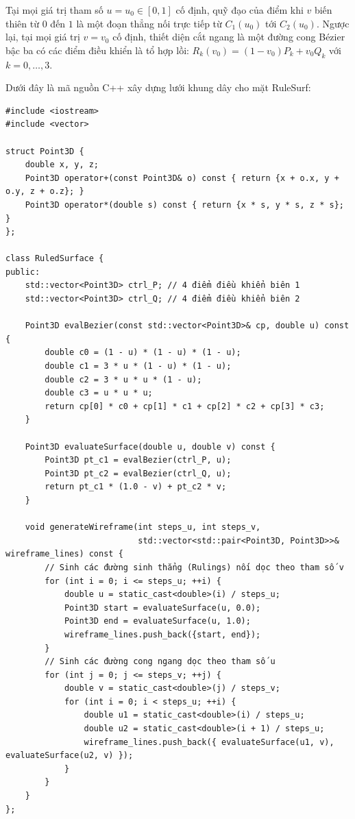 Tại mọi giá trị tham số $u = u_0 \in [0, 1]$ cố định, quỹ đạo của điểm khi $v$ biến thiên từ $0$ đến $1$ là một đoạn thẳng nối trực tiếp từ $C_1(u_0)$ tới $C_2(u_0)$. Ngược lại, tại mọi giá trị $v = v_0$ cố định, thiết diện cắt ngang là một đường cong Bézier bậc ba có các điểm điều khiển là tổ hợp lồi: $R_k(v_0) = (1 - v_0) P_k + v_0 Q_k$ với $k = 0, \dots, 3$.

Dưới đây là mã nguồn C++ xây dựng lưới khung dây cho mặt RuleSurf:

\begin{verbatim}
#include <iostream>
#include <vector>

struct Point3D {
    double x, y, z;
    Point3D operator+(const Point3D& o) const { return {x + o.x, y + o.y, z + o.z}; }
    Point3D operator*(double s) const { return {x * s, y * s, z * s}; }
};

class RuledSurface {
public:
    std::vector<Point3D> ctrl_P; // 4 điểm điều khiển biên 1
    std::vector<Point3D> ctrl_Q; // 4 điểm điều khiển biên 2

    Point3D evalBezier(const std::vector<Point3D>& cp, double u) const {
        double c0 = (1 - u) * (1 - u) * (1 - u);
        double c1 = 3 * u * (1 - u) * (1 - u);
        double c2 = 3 * u * u * (1 - u);
        double c3 = u * u * u;
        return cp[0] * c0 + cp[1] * c1 + cp[2] * c2 + cp[3] * c3;
    }

    Point3D evaluateSurface(double u, double v) const {
        Point3D pt_c1 = evalBezier(ctrl_P, u);
        Point3D pt_c2 = evalBezier(ctrl_Q, u);
        return pt_c1 * (1.0 - v) + pt_c2 * v;
    }

    void generateWireframe(int steps_u, int steps_v, 
                           std::vector<std::pair<Point3D, Point3D>>& wireframe_lines) const {
        // Sinh các đường sinh thẳng (Rulings) nối dọc theo tham số v
        for (int i = 0; i <= steps_u; ++i) {
            double u = static_cast<double>(i) / steps_u;
            Point3D start = evaluateSurface(u, 0.0);
            Point3D end = evaluateSurface(u, 1.0);
            wireframe_lines.push_back({start, end});
        }
        // Sinh các đường cong ngang dọc theo tham số u
        for (int j = 0; j <= steps_v; ++j) {
            double v = static_cast<double>(j) / steps_v;
            for (int i = 0; i < steps_u; ++i) {
                double u1 = static_cast<double>(i) / steps_u;
                double u2 = static_cast<double>(i + 1) / steps_u;
                wireframe_lines.push_back({ evaluateSurface(u1, v), evaluateSurface(u2, v) });
            }
        }
    }
};
\end{verbatim}

